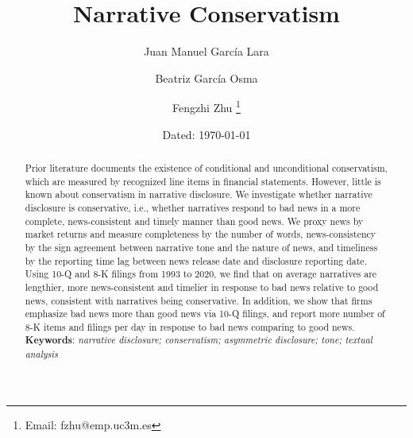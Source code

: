 \documentclass[a4paper]{article}
\begin{document}
	
	\title{Narrative Conservatism}

	\author{\vspace{1cm}Juan Manuel Garc\'ia Lara}
	
	\author{Beatriz Garc\'ia Osma}
	
	\author{Fengzhi Zhu%
		\thanks{Email: fzhu@emp.uc3m.es}}
	
	
	\date{\small Dated: \today}
	
	\maketitle
	
\thispagestyle{empty}
\begin{spacing}{2}

\begin{abstract}
	\begin{normalsize}
	\noindent
	Prior literature documents the existence of conditional and unconditional conservatism, which are measured by recognized line items in financial statements. However, little is known about conservatism in narrative disclosure. We investigate whether narrative disclosure is conservative, i.e., whether narratives respond to bad news in a more complete, news-consistent and timely manner than good news. We proxy news by market returns and measure completeness by the number of words, news-consistency by the sign agreement between narrative tone and the nature of news, and timeliness by the reporting time lag between news release date and disclosure reporting date. Using 10-Q and 8-K filings from 1993 to 2020, we find that on average narratives are lengthier, more news-consistent and timelier in response to bad news relative to good news, consistent with narratives being conservative. In addition, we show that firms emphasize bad news more than good news via 10-Q filings, and report more number of 8-K items and filings per day in response to bad news comparing to good news.
	\\

	\noindent
	\textbf{Keywords}: \textit{narrative disclosure; conservatism; asymmetric disclosure; tone; textual analysis}
	\end{normalsize}
\end{abstract}


\end{spacing}
\end{document}
